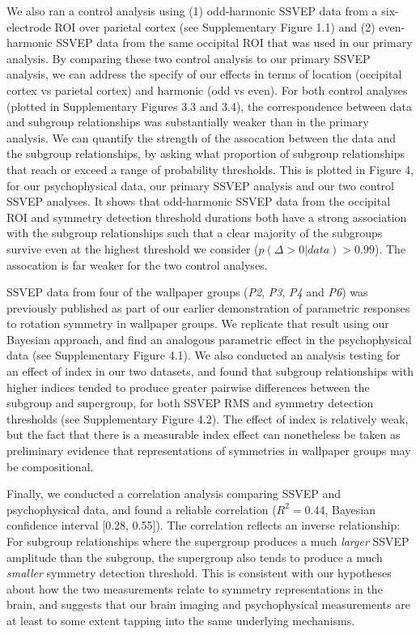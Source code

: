 \documentclass[9pt,twocolumn,twoside,lineno]{pnas-new}
\begin{document}
We also ran a control analysis using (1) odd-harmonic SSVEP data from a six-electrode ROI over parietal cortex (see Supplementary Figure 1.1) and (2) even-harmonic SSVEP data from the same occipital ROI that was used in our primary analysis. By comparing these two control analysis to our primary SSVEP analysis, we can address the specify of our effects in terms of location (occipital cortex vs parietal cortex) and harmonic (odd vs even). For both control analyses (plotted in Supplementary Figures 3.3 and 3.4), the correspondence between data and subgroup relationships was substantially weaker than in the primary analysis. We can quantify the strength of the assocation between the data and the subgroup relationships, by asking what proportion of subgroup relationships that reach or exceed a range of probability thresholds. This is plotted in Figure 4, for our psychophysical data, our primary SSVEP analysis and our two control SSVEP analyses. It shows that odd-harmonic SSVEP data from the occipital ROI and symmetry detection threshold durations both have a strong association with the subgroup relationships such that a clear majority of the subgroups survive even at the highest threshold we consider ($p(\Delta>0|data)>0.99$). The assocation is far weaker for the two control analyses.

SSVEP data from four of the wallpaper groups (\textit{P2}, \textit{P3}, \textit{P4} and \textit{P6}) was previously published as part of our earlier demonstration of parametric responses to rotation symmetry in wallpaper groups\cite{RN1725}. We replicate that result using our Bayesian approach, and find an analogous parametric effect in the psychophysical data (see Supplementary Figure 4.1). We also conducted an analysis testing for an effect of index in our two datasets, and found that subgroup relationships with higher indices tended to produce greater pairwise differences between the subgroup and supergroup, for both SSVEP RMS and symmetry detection thresholds (see Supplementary Figure 4.2). The effect of index is relatively weak, but the fact that there is a measurable index effect can nonetheless be taken as preliminary evidence that representations of symmetries in wallpaper groups may be compositional.

Finally, we conducted a correlation analysis comparing SSVEP and psychophysical data, and found a reliable correlation ($R^2 = 0.44$, Bayesian confidence interval [0.28, 0.55]). The correlation reflects an inverse relationship: For subgroup relationships where the supergroup produces a much \textit{larger} SSVEP amplitude than the subgroup, the supergroup also tends to produce a much \textit{smaller} symmetry detection threshold. This is consistent with our hypotheses about how the two measurements relate to symmetry representations in the brain, and suggests that our brain imaging and psychophysical measurements are at least to some extent tapping into the same underlying mechanisms.
\end{document}
